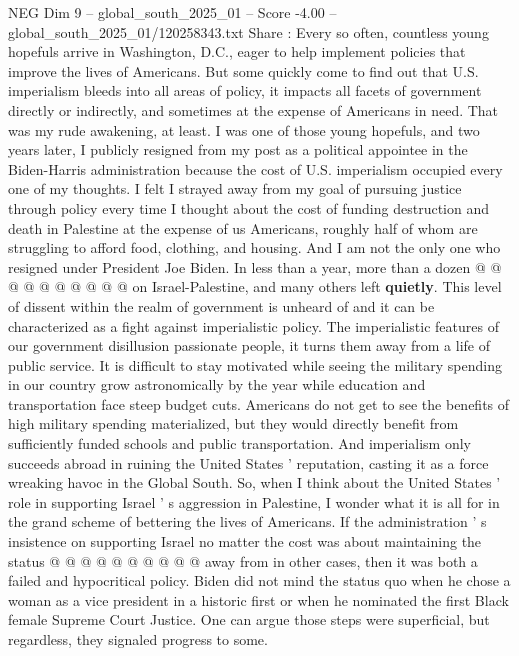 \begin{textsample}{NEG Dim 9 – global\_south\_2025\_01 – Score -4.00 – global\_south\_2025\_01/120258343.txt}  \label{ex:f9_neg_111}
Share : Every so often, countless young hopefuls arrive in Washington, D.C., eager to help implement policies that improve the lives of Americans.
But some quickly come to find out that U.S. imperialism bleeds into all areas of policy, it impacts all facets of government directly or indirectly, and sometimes at the expense of Americans in need.
That was my rude awakening, at least.
I was one of those young hopefuls, and two years later, I publicly resigned from my post as a political appointee in the Biden-Harris administration because the cost of U.S. imperialism occupied every one of my thoughts.
I felt I strayed away from my goal of pursuing justice through policy every time I thought about the cost of funding destruction and death in Palestine at the expense of us Americans, roughly half of whom are struggling to afford food, clothing, and housing.
And I am not the only one who resigned under President Joe Biden.
In less than a year, more than a dozen @ @ @ @ @ @ @ @ @ @ on Israel-Palestine, and many others left \textbf{quietly}.
This level of dissent within the realm of government is unheard of and it can be characterized as a fight against imperialistic policy.
The imperialistic features of our government disillusion passionate people, it turns them away from a life of public service.
It is difficult to stay motivated while seeing the military spending in our country grow astronomically by the year while education and transportation face steep budget cuts.
Americans do not get to see the benefits of high military spending materialized, but they would directly benefit from sufficiently funded schools and public transportation.
And imperialism only succeeds abroad in ruining the United States ' reputation, casting it as a force wreaking havoc in the Global South.
So, when I think about the United States ' role in supporting Israel ' s aggression in Palestine, I wonder what it is all for in the grand scheme of bettering the lives of Americans.
If the administration ' s insistence on supporting Israel no matter the cost was about maintaining the status @ @ @ @ @ @ @ @ @ @ away from in other cases, then it was both a failed and hypocritical policy.
Biden did not mind the status quo when he chose a woman as a vice president in a historic first or when he nominated the first Black female Supreme Court Justice.
One can argue those steps were superficial, but regardless, they signaled progress to some.

\end{textsample}
